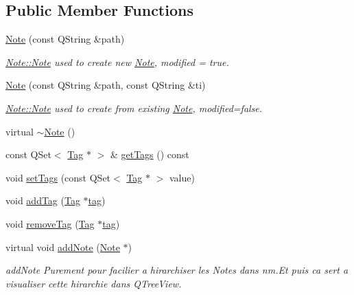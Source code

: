 \subsection*{Public Member Functions}
\begin{DoxyCompactItemize}
\item 
\hyperlink{class_note_adfec8c3dca48958989e1024b9ca4a513}{Note} (const Q\-String \&path)
\begin{DoxyCompactList}\small\item\em \hyperlink{class_note_adfec8c3dca48958989e1024b9ca4a513}{Note\-::\-Note} used to create new \hyperlink{class_note}{Note}, modified = true. \end{DoxyCompactList}\item 
\hyperlink{class_note_a6ef5e4ecfa2570c504c57185b6081234}{Note} (const Q\-String \&path, const Q\-String \&ti)
\begin{DoxyCompactList}\small\item\em \hyperlink{class_note_adfec8c3dca48958989e1024b9ca4a513}{Note\-::\-Note} used to create from existing \hyperlink{class_note}{Note}, modified=false. \end{DoxyCompactList}\item 
virtual \hyperlink{class_note_ade484273015c82e7fa59a028de0d8818}{$\sim$\-Note} ()
\item 
const Q\-Set$<$ \hyperlink{class_tag}{Tag} $\ast$ $>$ \& \hyperlink{class_note_ae5e065fdfce0d5c0ddbe63cce34059cb}{get\-Tags} () const 
\item 
void \hyperlink{class_note_ab62a4e0f47fac2b7a12ed76248996655}{set\-Tags} (const Q\-Set$<$ \hyperlink{class_tag}{Tag} $\ast$ $>$ value)
\item 
void \hyperlink{class_note_a6b023c0a13be0aa01a61a515fee15043}{add\-Tag} (\hyperlink{class_tag}{Tag} $\ast$\hyperlink{_filter_8h_a7ef0ab496f57e183b484e62e2053c94fa9daab2aa897c0d2d4500bed734b0d780}{tag})
\item 
void \hyperlink{class_note_ae165ceaf8ed5819aededc6842816de24}{remove\-Tag} (\hyperlink{class_tag}{Tag} $\ast$\hyperlink{_filter_8h_a7ef0ab496f57e183b484e62e2053c94fa9daab2aa897c0d2d4500bed734b0d780}{tag})
\item 
virtual void \hyperlink{class_note_aacfdc58fbd7b0ee3e50cf00771b5fec1}{add\-Note} (\hyperlink{class_note}{Note} $\ast$)
\begin{DoxyCompactList}\small\item\em add\-Note Purement pour facilier a hirarchiser les Notes dans nm.\-Et puis ca sert a visualiser cette hirarchie dans Q\-Tree\-View. \end{DoxyCompactList}\item 

\end{DoxyCompactItemize}
